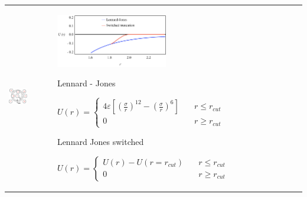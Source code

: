 \documentclass{scrbook}
\begin{document}
\begin{table}
\begin{tabularx}{\textwidth}{
p{}
p{}}
\includegraphics[width=0.45\textwidth]{gfx/image41.png} & \includegraphics[width=0.45\textwidth]{gfx/image42.png} \par Lennard - Jones \par 

$U\left(r\right)=\left\{ \begin{array}{cc}
4\varepsilon\left[\left(\frac{\sigma}{r}\right)^{12}-\left(\frac{\sigma}{r}\right)^{6}\right] & \quad r\leq r_{cut}\\
0 & \quad r\geq r_{cut}
\end{array}\right.$

\par Lennard \textendash{} Jones switched \par

$U\left(r\right)=\left\{ \begin{array}{cc}
U\left(r\right)-U\left(r=r_{cut}\right) & \quad r\leq r_{cut}\\
0 & \quad r\geq r_{cut}
\end{array}\right.$

\\
\end{tabularx}
\end{table}
\end{document}
